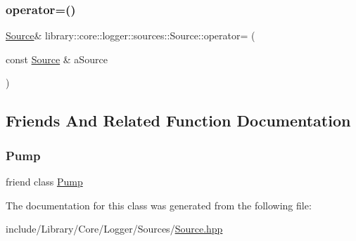 \mbox{\label{classlibrary_1_1core_1_1logger_1_1sources_1_1_source_a5d08e7063ee3b5d1c2b894d9747cc35f}} 
\subsubsection{\texorpdfstring{operator=()}{operator=()}}
{\footnotesize\ttfamily \mbox{\hyperlink{classlibrary_1_1core_1_1logger_1_1sources_1_1_source}{Source}}\& library\+::core\+::logger\+::sources\+::\+Source\+::operator= (\begin{DoxyParamCaption}\item[{const \mbox{\hyperlink{classlibrary_1_1core_1_1logger_1_1sources_1_1_source}{Source}} \&}]{a\+Source }\end{DoxyParamCaption})\hspace{0.3cm}{\ttfamily [default]}}



\subsection{Friends And Related Function Documentation}
\mbox{\label{classlibrary_1_1core_1_1logger_1_1sources_1_1_source_a64fbdb62a5c5f27e0d022da36aab93d9}} 
\subsubsection{\texorpdfstring{Pump}{Pump}}
{\footnotesize\ttfamily friend class \mbox{\hyperlink{classlibrary_1_1core_1_1logger_1_1_pump}{Pump}}\hspace{0.3cm}{\ttfamily [friend]}}



The documentation for this class was generated from the following file\+:\begin{DoxyCompactItemize}
\item 
include/\+Library/\+Core/\+Logger/\+Sources/\mbox{\hyperlink{_sources_2_source_8hpp}{Source.\+hpp}}\end{DoxyCompactItemize}
